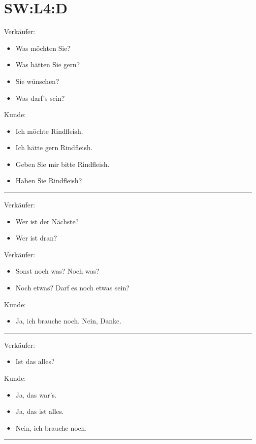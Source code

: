 \section{SW:L4:D}
Verkäufer:
\begin{itemize}
    \item Was möchten Sie?
    \item Was hätten Sie gern? 
    \item Sie wünschen?
    \item Was darf's sein? 
\end{itemize}
Kunde:
\begin{itemize}
    \item Ich möchte Rindfleish.
    \item Ich hätte gern Rindfleish.
    \item Geben Sie mir bitte Rindfleish. 
    \item Haben Sie Rindfleish?
\end{itemize}
\rule{\textwidth}{0.05em}
Verkäufer:
\begin{itemize}
    \item Wer ist der Nächste? 
    \item Wer ist dran? 
\end{itemize}
Verkäufer:
\begin{itemize}
    \item Sonst noch was? Noch was?
    \item Noch etwas? Darf es noch etwas sein? 
          \\
\end{itemize}
Kunde:
\begin{itemize}
    \item Ja, ich brauche noch. Nein, Danke.
\end{itemize}
\rule{\textwidth}{0.05em}
Verkäufer:
\begin{itemize}
    \item Ist das alles?
\end{itemize}
Kunde:
\begin{itemize}
    \item Ja, das war's.
    \item Ja, das ist alles.
    \item Nein, ich brauche noch.
\end{itemize}
\rule{\textwidth}{0.05em}

